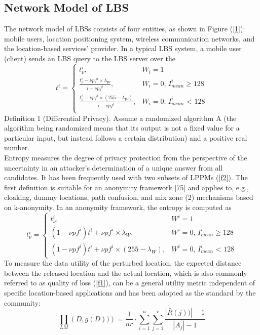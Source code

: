 \documentclass{acmart}
\begin{document}
\subsection{Network Model of LBS}
The network model of LBSs consists of four entities, as shown in Figure (\ref{1}): mobile users, location positioning system, wireless communication networks, and the location-based services’ provider. In a typical LBS system, a mobile user (client) sends an LBS query to the LBS server over the
\begin{equation}
\label{f1}
    t^i = 
    \begin{cases}
    t^i_{\nu}, &\text{$W_i=1$}\\ 
    \frac{t^i_\nu-\nu p f^i \times \lambda_W}{i - \nu p f^i}, &\text{$W_i=0$, $I^i_{mean} \ge 128$}\\
    \frac{t^i_\nu-\nu p f^i \times (255-\lambda_W)}{i - \nu p f^i}, &\text{$W_i=0$, $I^i_{mean}$ < 128}\\
    \end{cases}
\end{equation}
Definition 1 (Differential Privacy). Assume a randomized algorithm A (the algorithm being randomized means that its output is not a fixed value for a particular input, but instead follows a certain distribution) and a positive real number.
\\
Entropy measures the degree of privacy protection from the perspective of the uncertainty in an attacker’s determination of a unique answer from all candidates. It has been frequently used with two subsets of LPPMs (\ref{f2}). The first definition is suitable for an anonymity framework [75] and applies to, e.g., cloaking, dummy locations, path confusion, and mix zone (2) mechanisms based on k-anonymity. In an anonymity framework, the entropy is computed as
\begin{equation}
\label{f2}
    t^i_\nu = 
    \begin{cases}
    t^i_\nu, &\text{$W^i=1$}\\
    {(1-\nu p f^i)t^i+\nu p f^i\times \lambda_W}, &\text{$W^i=0$, $I^i_{mean} \ge 128$}\\
    {(1-\nu p f^i)t^i+\nu p f^i\times(255 -\lambda_W)}, &\text{$W^i=0$, $I^i_{mean}$ < 128}
    \end{cases}
\end{equation}
To measure the data utility of the perturbed location, the expected distance between the released location and the actual location, which is also commonly referred to as quality of loss (\ref{f1}), can be a general utility metric independent of specific location-based applications and has been adopted as the standard by the community:
\begin{equation}
\label{f3}
  \prod _{LM}\left ( D,g(D)) \right )=\frac{1}{nr}\cdot \sum_{i=1}^{n}\sum_{j=1}^{r}\frac{\left | \bar{R}(j)) \right |  -1}{\left | A_{j} \right | -1}
\end{equation}
\end{document}
